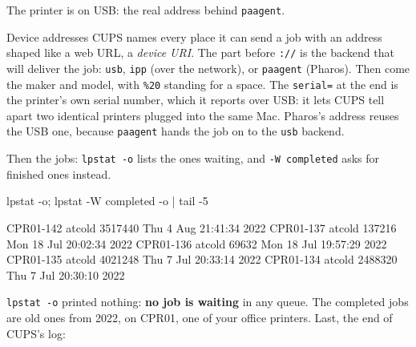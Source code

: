 \documentclass[11pt,a4paper]{article}
\begin{document}
The printer is on USB: the real address behind \texttt{paagent}.

\begin{insight}{Device addresses}
CUPS names every place it can send a job with an address shaped like a web URL, a \emph{device URI}. The part before \texttt{://} is the backend that will deliver the job: \texttt{usb}, \texttt{ipp} (over the network), or \texttt{paagent} (Pharos). Then come the maker and model, with \texttt{\%20} standing for a space. The \texttt{serial=} at the end is the printer's own serial number, which it reports over USB: it lets CUPS tell apart two identical printers plugged into the same Mac. Pharos's address reuses the USB one, because \texttt{paagent} hands the job on to the \texttt{usb} backend.
\end{insight}

Then the jobs: \texttt{lpstat -o} lists the ones waiting, and \texttt{-W completed} asks for finished ones instead.

\begin{mine}
lpstat -o; lpstat -W completed -o | tail -5
\end{mine}
\begin{cmdout}
CPR01-142               atcold         3517440   Thu  4 Aug 21:41:34 2022
CPR01-137               atcold          137216   Mon 18 Jul 20:02:34 2022
CPR01-136               atcold           69632   Mon 18 Jul 19:57:29 2022
CPR01-135               atcold         4021248   Thu  7 Jul 20:33:14 2022
CPR01-134               atcold         2488320   Thu  7 Jul 20:30:10 2022
\end{cmdout}

\texttt{lpstat -o} printed nothing: \textbf{no job is waiting} in any queue. The completed jobs are old ones from 2022, on CPR01, one of your office printers. Last, the end of CUPS's log:
\end{document}
